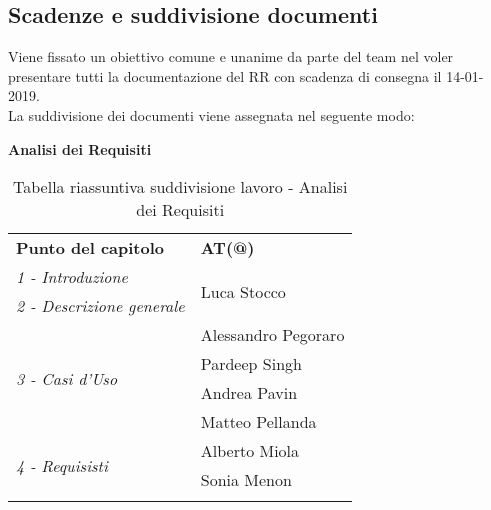 \subsection{Scadenze e suddivisione documenti}
\label{sec:scadenza}
	Viene fissato un obiettivo comune e unanime da parte del team nel voler presentare tutti la documentazione del RR con scadenza di consegna il 14-01-2019.\\
	La suddivisione dei documenti viene assegnata nel seguente modo:
	\\[1.5cm]
		\begin{center}
		\textbf{Analisi dei Requisiti}\\[0.25cm]
		\renewcommand{\arraystretch}{1.5}
		\begin{longtable}{  p{5cm} p{4cm}  }
			
			\rowcolor{tableHeadYellow}
			\textbf{Punto del capitolo}&\textbf{AT(@)}\\
				\emph{1 - Introduzione} & \multirow{2}{*}{Luca Stocco}\\ \emph{2 - Descrizione generale}  \\
				\hline
				\multirow{4}{*}{\emph{3 - Casi d'Uso}} & Alessandro Pegoraro\\&Pardeep Singh\\&Andrea Pavin\\&Matteo Pellanda\\
				\hline
				\multirow{2}{*}{\emph{4 - Requisisti}} &  Alberto Miola\\&Sonia Menon\\
				\hline
				\rowcolor{white}
			\caption{Tabella riassuntiva suddivisione lavoro - Analisi dei Requisiti}
			\label{sec:tabella_riassuntiva1}
		\end{longtable}	
		\end{center}
	
